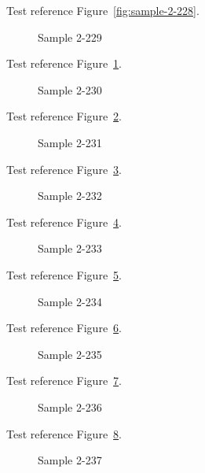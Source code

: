 Test reference Figure~\ref{fig:sample-2-228}.

\begin{figure}[tbhp]
\caption{Sample 2-229}
\label{fig:sample-2-229}
\end{figure}

Test reference Figure~\ref{fig:sample-2-229}.

\begin{figure}[tbhp]
\caption{Sample 2-230}
\label{fig:sample-2-230}
\end{figure}

Test reference Figure~\ref{fig:sample-2-230}.

\begin{figure}[tbhp]
\caption{Sample 2-231}
\label{fig:sample-2-231}
\end{figure}

Test reference Figure~\ref{fig:sample-2-231}.

\begin{figure}[tbhp]
\caption{Sample 2-232}
\label{fig:sample-2-232}
\end{figure}

Test reference Figure~\ref{fig:sample-2-232}.

\begin{figure}[tbhp]
\caption{Sample 2-233}
\label{fig:sample-2-233}
\end{figure}

Test reference Figure~\ref{fig:sample-2-233}.

\begin{figure}[tbhp]
\caption{Sample 2-234}
\label{fig:sample-2-234}
\end{figure}

Test reference Figure~\ref{fig:sample-2-234}.

\begin{figure}[tbhp]
\caption{Sample 2-235}
\label{fig:sample-2-235}
\end{figure}

Test reference Figure~\ref{fig:sample-2-235}.

\begin{figure}[tbhp]
\caption{Sample 2-236}
\label{fig:sample-2-236}
\end{figure}

Test reference Figure~\ref{fig:sample-2-236}.

\begin{figure}[tbhp]
\caption{Sample 2-237}
\label{fig:sample-2-237}
\end{figure}

